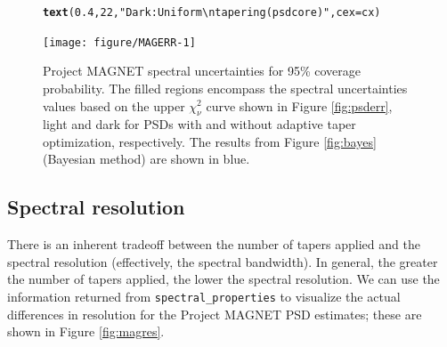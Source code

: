 \documentclass[10pt]{article}\usepackage[]{graphicx}\usepackage[]{color}
\makeatletter
\newcommand{\hlnum}[1]{\textcolor[rgb]{0.686,0.059,0.569}{#1}}%
\newcommand{\hlstr}[1]{\textcolor[rgb]{0.192,0.494,0.8}{#1}}%
\newcommand{\hlstd}[1]{\textcolor[rgb]{0.345,0.345,0.345}{#1}}%
\newcommand{\hlkwc}[1]{\textcolor[rgb]{0.333,0.667,0.333}{#1}}%
\newcommand{\hlkwd}[1]{\textcolor[rgb]{0.737,0.353,0.396}{\textbf{#1}}}%
\newenvironment{kframe}{%
 \def\at@end@of@kframe{}%
 \ifinner\ifhmode%
  \def\at@end@of@kframe{\end{minipage}}%
  \begin{minipage}{\columnwidth}%
 \fi\fi%
 \def\FrameCommand##1{\hskip\@totalleftmargin \hskip-\fboxsep
 \colorbox{shadecolor}{##1}\hskip-\fboxsep
     \hskip-\linewidth \hskip-\@totalleftmargin \hskip\columnwidth}%
 \MakeFramed {\advance\hsize-\width
   \@totalleftmargin\z@ \linewidth\hsize
   \@setminipage}}%
 {\par\unskip\endMakeFramed%
 \at@end@of@kframe}
\newenvironment{knitrout}{}{} %
\newcommand{\Rcmd}[1]{\texttt{#1}}
\makeatother
\begin{document}
\begin{figure}[h!]
\begin{center}
\begin{knitrout}
\begin{kframe}
{\ttfamily\noindent\bfseries\color{errorcolor}{\#\# Error in xy.coords(x, y): object 'pspau' not found}}\begin{alltt}
\hlkwd{text}\hlstd{(}\hlnum{0.4}\hlstd{,} \hlnum{22}\hlstd{,} \hlstr{"Dark: Uniform\textbackslash{}ntapering (psdcore)"}\hlstd{,} \hlkwc{cex} \hlstd{= cx)}
\end{alltt}
\end{kframe}
\texttt{[image: figure/MAGERR-1]} 

\end{knitrout}
\caption{Project MAGNET spectral uncertainties for 95\% coverage probability.
The filled regions encompass the spectral uncertainties values based on the
upper $\chi_\nu^2$ curve shown in Figure \ref{fig:psderr}, light and dark for 
PSDs with and without adaptive taper optimization, respectively.
The results from Figure \ref{fig:bayes} (Bayesian method) are shown in blue.
}
\label{fig:magerr}
\end{center}
\end{figure}

\subsection{Spectral resolution}
There is an inherent tradeoff between the number of tapers 
applied and the spectral resolution (effectively, the spectral bandwidth).
In general, the greater the number of tapers applied, the lower the spectral resolution.
We can use the information returned from \Rcmd{spectral\_properties}
to visualize the actual 
differences in resolution for the Project MAGNET PSD estimates; these
are shown
in Figure \ref{fig:magres}.
\end{document}
